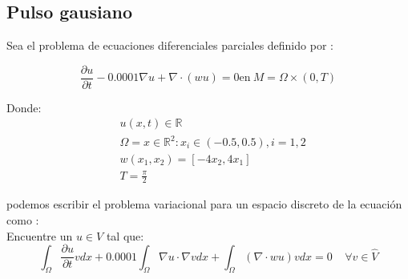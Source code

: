 \documentclass[12pt]{article}
\begin{document}
\subsection{Pulso gausiano}

Sea el problema de ecuaciones diferenciales parciales definido por : 

\begin{equation}
	\frac{\partial u}{\partial t} - 0.0001 \nabla  u + \nabla \cdot (w u)=0 \text{en} \  M=\Omega \times (0,T) 
	\label{pulse}
\end{equation}

Donde:  
\begin{align}
	&u(x,t) \in \mathbb{R}\\
	&\Omega = {x \in \mathbb{R}^2 : x_i \in (-0.5,0.5), i=1,2 }\\
		&w(x_1,x_2) = [-4x_2,4x_1] \\
		&T= \frac{\pi}{2}
\end{align}

podemos escribir el problema variacional para un espacio discreto de la ecuación como : \\

Encuentre un $u \in V$ tal que:  
\begin{equation}
\int_\Omega \frac{\partial u}{\partial t}v dx + 0.0001\int_\Omega\nabla u\cdot\nabla v dx  + \int _\Omega (\nabla \cdot wu)v dx  = 0 \ \ \ \ \  \forall v \in \hat{V}
\end{equation}
\end{document}
